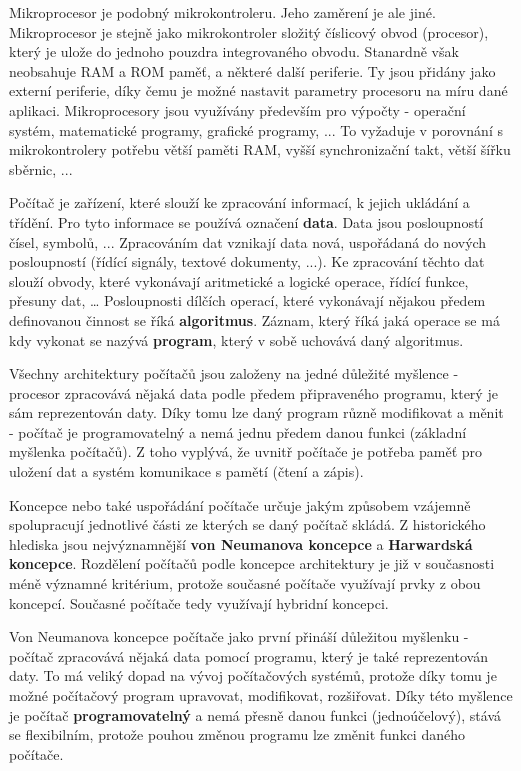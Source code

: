 
Mikroprocesor je podobný mikrokontroleru. Jeho zaměrení je ale jiné. Mikroprocesor je stejně jako mikrokontroler složitý číslicový obvod (procesor), který je ulože do jednoho pouzdra integrovaného obvodu. Stanardně však neobsahuje RAM a ROM paměť, a některé další periferie. Ty jsou přidány jako externí periferie, díky čemu je možné nastavit parametry procesoru na míru dané aplikaci. Mikroprocesory jsou využívány především pro výpočty - operační systém, matematické programy, grafické programy, ... To vyžaduje v porovnání s mikrokontrolery potřebu větší paměti RAM, vyšší synchronizační takt, větší šířku sběrnic, ...



Počítač je zařízení, které slouží ke zpracování informací, k jejich ukládání a třídění. Pro tyto informace se používá označení {\bf data}. Data jsou posloupností čísel, symbolů, ... Zpracováním dat vznikají data nová, uspořádaná do nových posloupností (řídící signály, textové dokumenty, ...). Ke zpracování těchto dat slouží  obvody, které vykonávají aritmetické a logické operace, řídící funkce, přesuny dat, … Posloupnosti dílčích operací, které vykonávají nějakou předem definovanou činnost se říká {\bf algoritmus}. Záznam, který říká jaká operace se má kdy vykonat se nazývá {\bf program}, který v sobě uchovává daný algoritmus.

Všechny architektury počítačů jsou založeny na jedné důležité myšlence - procesor zpracovává nějaká data podle předem připraveného programu, který je sám reprezentován daty. Díky tomu lze daný program různě modifikovat a měnit - počítač je programovatelný a nemá jednu předem danou funkci (základní myšlenka počítačů). Z toho vyplývá, že uvnitř počítače je potřeba paměť pro uložení dat a systém komunikace s pamětí (čtení a zápis).

Koncepce nebo také uspořádání počítače určuje jakým způsobem vzájemně spolupracují jednotlivé části ze kterých se daný počítač skládá. Z historického hlediska jsou nejvýznamnější {\bf von Neumanova koncepce} a  {\bf Harwardská koncepce}. Rozdělení počítačů podle koncepce architektury je již v současnosti méně významné kritérium, protože současné počítače využívají prvky z obou koncepcí. Současné počítače tedy využívají hybridní koncepci.


Von Neumanova koncepce počítače jako první přináší důležitou myšlenku - počítač zpracovává nějaká data pomocí programu, který je také reprezentován daty. To má veliký dopad na vývoj počítačových systémů, protože díky tomu je možné počítačový program upravovat, modifikovat, rozšiřovat. Díky této myšlence je počítač {\bf programovatelný} a nemá přesně danou funkci (jednoúčelový), stává se flexibilním, protože pouhou změnou programu lze změnit funkci daného počítače. 

